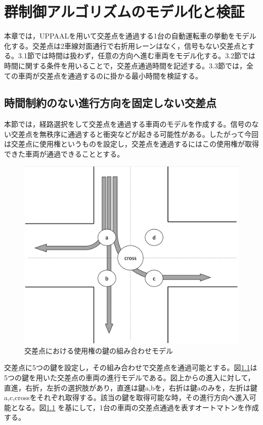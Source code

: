 \documentclass{tpu-sotu}
\begin{document}
\chapter{群制御アルゴリズムのモデル化と検証}
本章では，UPPAALを用いて交差点を通過する1台の自動運転車の挙動をモデル化する。交差点は2車線対面通行で右折用レーンはなく，信号もない交差点とする。3.1節では時間は扱わず，任意の方向へ進む車両をモデル化する。3.2節では時間に関する条件を用いることで，交差点通過時間を記述する。3.3節では，全ての車両が交差点を通過するのに掛かる最小時間を検証する。
	\section{時間制約のない進行方向を固定しない交差点}
	本節では，経路選択をして交差点を通過する車両のモデルを作成する。信号のない交差点を無秩序に通過すると衝突などが起きる可能性がある。したがって今回は交差点に使用権というものを設定し，交差点を通過するにはこの使用権が取得できた車両が通過できることとする。
	
	\begin{figure}[htbp]
	\centering
	\includegraphics[width=120mm]{IntersectionM.png}
	\caption{交差点における使用権の鍵の組み合わせモデル}
	\label{IM}
	\end{figure}
	交差点に5つの鍵を設定し，その組み合わせで交差点を通過可能とする。図\ref{IM}は5つの鍵を用いた交差点の車両の進行モデルである。図上からの進入に対して，直進，右折，左折の選択肢があり，直進は鍵a,bを，右折は鍵aのみを，左折は鍵a,c,crossをそれぞれ取得する。該当の鍵を取得可能な時，その進行方向へ進入可能となる。図\ref{IM} を基にして，1台の車両の交差点通過を表すオートマトンを作成する。
\end{document}

